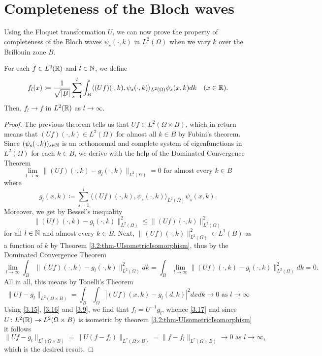 \section{Completeness of the Bloch waves} \label{sec:5.2}

Using the Floquet transformation $U$, we can now prove the property of completeness of the Bloch waves $\psi_{s}(\cdot, k)$ in $L^{2}(\Omega)$ when we vary $k$ over the Brillouin zone $B$.
	
\begin{theorem} \label{3.3:thm-flConvergence}
		For each $f \in L^{2}(\mathbb{R})$ and $l \in \mathbb{N}$, we define
			\begin{equation}
				f_{l}(x) \coloneqq \frac{1}{\sqrt{|B|}} \sum_{s=1}^{l} \int_{B} \langle (Uf)(\cdot, k), \psi_{s}(\cdot, k) \rangle_{L^{2}(\Omega)} \psi_{s}(x, k) dk \quad (x \in \mathbb{R}). \label{3.15}
			\end{equation}
		Then, $f_{l} \rightarrow f$ in $L^{2}(\mathbb{R})$ as $l \rightarrow \infty$.

	\begin{proof}
		The previous theorem tells us that $Uf \in L^{2}(\Omega \times B)$, which in return means that $(Uf)(\cdot, k) \in L^{2}(\Omega)$ for almost all $k \in B$ by Fubini's theorem. Since $(\psi_{s}(\cdot, k))_{s \in \mathbb{N}}$ is an orthonormal and complete system of eigenfunctions in $L^{2}(\Omega)$ for each $k \in B$, we derive with the help of the Dominated Convergence Theorem
			\[ \lim_{l \rightarrow \infty} \| (Uf)(\cdot, k) - g_{l}(\cdot, k) \|_{L^{2}(\Omega)} = 0 \text{ for almost every } k \in B \]
		where 
			\begin{equation}
				g_{l}(x, k) \coloneqq \sum_{s=1}^{l} \langle(Uf)(\cdot, k), \psi_{s}(\cdot,k)\rangle_{L^{2}(\Omega)} \psi_{s}(x,k). \label{3.16}
			\end{equation}
		Moreover, we get by Bessel's inequality
			\[ \| (Uf)(\cdot, k) - g_{l}(\cdot, k) \|^{2}_{L^{2}(\Omega)} \leq \| (Uf)(\cdot, k) \|^{2}_{L^{2}(\Omega)}  \]
		for all $l \in \mathbb{N}$ and almost every $k \in B$. Next, $\|(Uf)(\cdot, k)\|^{2}_{L^{2}(\Omega)} \in L^{1}(B)$ as a function of $k$ by Theorem \ref{3.2:thm-UIsometricIsomorphism}, thus by the Dominated Convergence Theorem
		\[ \lim_{l \rightarrow \infty} \int_{B} \| (Uf)(\cdot, k) - g_{l}(\cdot, k) \|^{2}_{L^{2}(\Omega)} dk  = \int_{B} \lim_{l \rightarrow \infty}  \| (Uf)(\cdot, k) - g_{l}(\cdot, k) \|^{2}_{L^{2}(\Omega)} dk = 0. \]
		  All in all, this means by Tonelli's Theorem
			\begin{equation}
				\| U f - g_{l} \|_{L^{2}(\Omega \times B)} = \int_{B} \int_{\Omega} \left| (Uf)(x, k) - g_{l}(d, k) \right|^{2} dx dk \rightarrow 0 \text{ as } l \rightarrow \infty \label{3.17}
			\end{equation} 
		 Using \eqref{3.15}, \eqref{3.16} and \eqref{3.9}, we find that $f_{l} = U^{-1}g_{l}$, whence \eqref{3.17} and since $U \colon L^{2}(\mathbb{R}) \rightarrow L^{2}(\Omega \times B)$ is isometric by theorem \ref{3.2:thm-UIsometricIsomorphism} it follows
			\[ \| U f - g_{l} \|_{L^{2}(\Omega \times B)} = \| U(f - f_{l}) \|_{L^{2}(\Omega \times B)} = \| f - f_{l} \|_{L^{2}(\Omega \times B)} \rightarrow 0 \text{ as } l \rightarrow \infty,\]
		 which is the desired result.
	\end{proof}
\end{theorem}